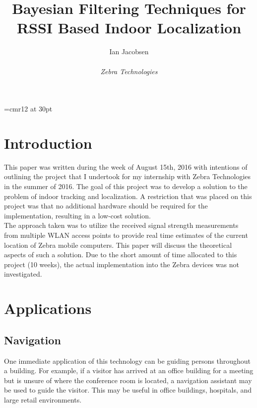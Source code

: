 \documentclass[12pt, a4paper]{article}
\begin{document}
\font\myfont=cmr12 at 30pt
\title{{\myfont Bayesian Filtering Techniques for RSSI Based Indoor Localization}\\}

\author{{\Huge Ian Jacobsen}\\ \\{\Large \textit{Zebra Technologies}}}
\maketitle


	\maketitle
	\newpage

	\section{Introduction}
		This paper was written during the week of August 15th, 2016 with intentions of outlining the project that I undertook for my internship with Zebra Technologies in the summer of 2016. The goal of this project was to develop a solution to the problem of indoor tracking and localization. A restriction that was placed on this project was that no additional hardware should be required for the implementation, resulting in a low-cost solution.\\
		The approach taken was to utilize the received signal strength measurements from multiple WLAN access points to provide real time estimates of the current location of Zebra mobile computers. This paper will discuss the theoretical aspects of such a solution. Due to the short amount of time allocated to this project (10 weeks), the actual implementation into the Zebra devices was not investigated.
	\section{Applications}
		\subsection{Navigation}
		One immediate application of this technology can be guiding persons throughout a building. For example, if a visitor has arrived at an office building for a meeting but is unsure of where the conference room is located, a navigation assistant may be used to guide the visitor. This may be useful in office buildings, hospitals, and large retail environments.
\end{document}
